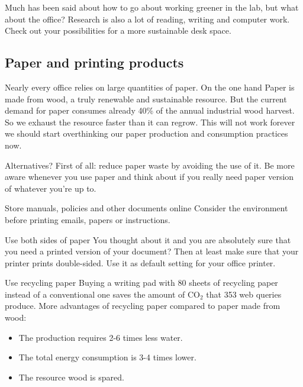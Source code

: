  Much has been said about how to go about working greener in the lab, but what about the office? Research is also a lot of reading, writing and computer work. Check out your possibilities for a more sustainable desk space. 
 
\subsection{Paper and printing products}
	
	Nearly every office relies on large quantities of paper. On the one hand Paper is made from wood, a truly renewable and sustainable resource. But the current demand for paper consumes already 40\% of the annual industrial wood harvest. So we exhaust the resource faster than it can regrow.  \cite{WWF} This will not work forever we should start overthinking our paper production and consumption practices now. 

\begin{suggest}{Alternatives?}
	First of all: reduce paper waste by avoiding the use of it. 
	Be more aware whenever you use paper and think about if you really need paper version of whatever you're up to. 
\end{suggest}

\begin{suggest}{Store manuals, policies and other documents online}
		 Consider the environment before printing emails, papers or instructions. 
\end{suggest}

\begin{suggest}{Use both sides of paper}
	You thought about it and you are absolutely sure that you need a printed version of your document? Then at least make sure that your printer prints double-sided. Use it as default setting for your office printer.
\end{suggest}

\begin{suggest}{Use recycling paper}
	Buying a writing pad with 80 sheets of recycling paper instead of a conventional one 
	saves the amount of CO$_2$ that 353 web queries produce.
	More advantages of recycling paper compared to paper made from wood:  
	\begin{itemize}
		\item  The production requires 2-6 times less water.
		\item  The total energy consumption is 3-4 times lower. %
		\item  The resource wood is spared.
	\end{itemize}  
\end{suggest}
	
